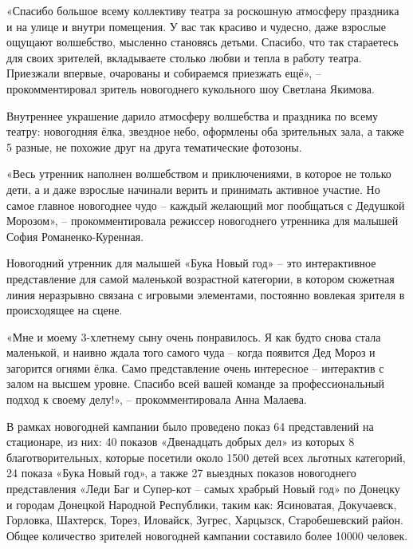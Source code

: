 
«Спасибо большое всему коллективу театра за роскошную атмосферу праздника и на
улице и внутри помещения. У вас так красиво и чудесно, даже взрослые ощущают
волшебство, мысленно становясь детьми. Спасибо, что так стараетесь для своих
зрителей, вкладываете столько любви и тепла в работу театра. Приезжали впервые,
очарованы и собираемся приезжать ещё», – прокомментировал зритель новогоднего
кукольного шоу Светлана Якимова.


Внутреннее украшение дарило атмосферу волшебства и праздника по всему театру:
новогодняя ёлка, звездное небо, оформлены оба зрительных зала, а также 5
разные, не похожие друг на друга тематические фотозоны.

«Весь утренник наполнен волшебством и приключениями, в которое не только дети,
а и даже взрослые начинали верить и принимать активное участие. Но самое
главное новогоднее чудо – каждый желающий мог пообщаться с Дедушкой Морозом», –
прокомментировала режиссер новогоднего утренника для малышей София
Романенко-Куренная.

Новогодний утренник для малышей «Бука Новый год» – это интерактивное
представление для самой маленькой возрастной категории, в котором сюжетная
линия неразрывно связана с игровыми элементами, постоянно вовлекая зрителя в
происходящее на сцене.

«Мне и моему 3-хлетнему сыну очень понравилось. Я как будто снова стала
маленькой, и наивно ждала того самого чуда – когда появится Дед Мороз и
загорится огнями ёлка. Само представление очень интересное – интерактив с залом
на высшем уровне. Спасибо всей вашей команде за профессиональный подход к
своему делу!», – прокомментировала Анна Малаева.

В рамках новогодней кампании было проведено показ 64 представлений на
стационаре, из них: 40 показов «Двенадцать добрых дел» из которых 8
благотворительных, которые посетили около 1500 детей всех льготных категорий,
24 показа «Бука Новый год», а также 27 выездных показов новогоднего
представления «Леди Баг и Супер-кот – самых храбрый Новый год» по Донецку и
городам Донецкой Народной Республики, таким как: Ясиноватая, Докучаевск,
Горловка, Шахтерск, Торез, Иловайск, Зугрес, Харцызск, Старобешевский район.
Общее количество зрителей новогодней кампании составило более 10000 человек.
